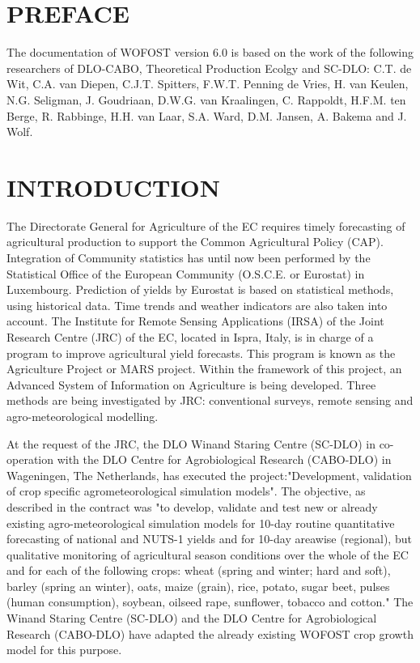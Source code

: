 
\chapter*{PREFACE}

The documentation of WOFOST version 6.0 is based on the work of the following
researchers of DLO-CABO, Theoretical Production Ecolgy and SC-DLO: C.T. de
Wit, C.A. van Diepen, C.J.T. Spitters, F.W.T. Penning de Vries, H. van Keulen, N.G.
Seligman, J. Goudriaan, D.W.G. van Kraalingen, C. Rappoldt, H.F.M. ten Berge, R.
Rabbinge, H.H. van Laar, S.A. Ward, D.M. Jansen, A. Bakema and J. Wolf.
\newpage

\chapter*{INTRODUCTION}

The Directorate General for Agriculture of the EC requires timely forecasting of
agricultural production to support the Common Agricultural Policy (CAP). 
Integra\-tion of Community statistics has until now been performed by the Statistical Office of
the European Community (O.S.C.E. or Eurostat) in Luxembourg. Prediction of yields
by Eurostat is based on statistical methods, using historical data. Time trends and
weather indicators are also taken into account. The Institute for Remote Sensing
Applications (IRSA) of the Joint Research Centre (JRC) of the EC, located in Ispra,
Italy, is in charge of a program to improve agricultural yield forecasts. This program
is known as the Agriculture Project or MARS project. Within the framework of this
project, an Advanced System of Information on Agriculture is being developed. Three
methods are being investigated by JRC: conventional surveys, remote sensing and
agro-meteorological modelling.

At the request of the JRC, the DLO Winand Staring Centre (SC-DLO) in co-operation with the 
DLO Centre for Agrobiological Research (CABO-DLO) in
Wageningen, The Nether\-lands, has executed the project:"Development, validation of
crop specific agrometeorological simulation models". The objective, as described in
the contract was "to develop, validate and test new or already existing agro-meteoro\-logical simulation models for 10-day routine quantitative forecasting of national and
NUTS-1 yields  and for 10-day areawise (regional), but qualitative monitoring of
agricultural season conditions over the whole of the EC and for each of the following
crops: wheat (spring and winter; hard and soft), barley (spring an winter), oats, maize
(grain), rice, potato, sugar beet, pulses (human consumption), soybean, oilseed rape,
sunflower, tobacco and cotton."  The Winand Staring Centre (SC-DLO) and the DLO
Centre for Agrobiological Research (CABO-DLO) have adapted the already existing
WOFOST crop growth model for this purpose.

